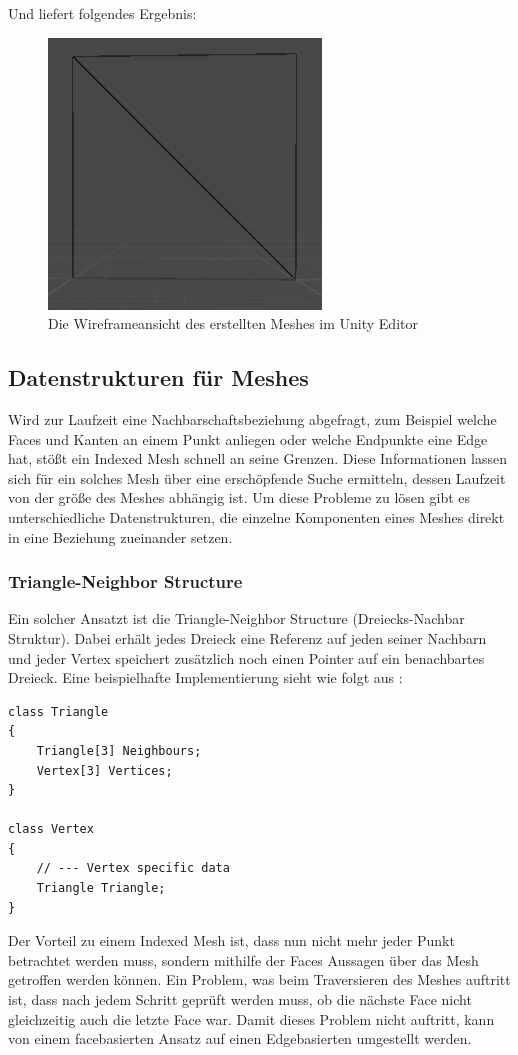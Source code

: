 Und liefert folgendes Ergebnis:
\begin{figure}[h]
	\centering
	\includegraphics[width=0.35\linewidth]{Images/UnityQuadWireframe}
	\caption[Die Wireframeansicht des erstellten Meshes]{Die Wireframeansicht des erstellten Meshes im Unity Editor}
	\label{fig:unityquadwireframe}
\end{figure}

\subsection{Datenstrukturen f\"ur Meshes}
Wird zur Laufzeit eine Nachbarschaftsbeziehung abgefragt, zum Beispiel welche Faces und Kanten an einem Punkt anliegen oder welche Endpunkte eine Edge hat, st\"o{\ss}t ein Indexed Mesh schnell an seine Grenzen. Diese Informationen lassen sich f\"ur ein solches Mesh \"uber eine ersch\"opfende Suche ermitteln, dessen Laufzeit von der gr\"o{\ss}e des Meshes abh\"angig ist. Um diese Probleme zu l\"osen gibt es unterschiedliche Datenstrukturen, die einzelne Komponenten eines Meshes direkt in eine Beziehung zueinander setzen.

\subsubsection{Triangle-Neighbor Structure}
Ein solcher Ansatzt ist die Triangle-Neighbor Structure (Dreiecks-Nachbar Struktur). Dabei erh\"alt jedes Dreieck eine Referenz auf jeden seiner Nachbarn und jeder Vertex speichert zus\"atzlich noch einen Pointer auf ein benachbartes Dreieck. Eine beispielhafte Implementierung sieht wie folgt aus \cite[S.269]{Shirley2010}:
\begin{lstlisting}
class Triangle 
{
	Triangle[3] Neighbours;
	Vertex[3] Vertices; 
}

class Vertex 
{
	// --- Vertex specific data
	Triangle Triangle;
}
\end{lstlisting}

Der Vorteil zu einem Indexed Mesh ist, dass nun nicht mehr jeder Punkt betrachtet werden muss, sondern mithilfe der Faces Aussagen \"uber das Mesh getroffen werden k\"onnen. Ein Problem, was beim Traversieren des Meshes auftritt ist, dass nach jedem Schritt gepr\"uft werden muss, ob die n\"achste Face nicht gleichzeitig auch die letzte Face war. Damit dieses Problem nicht auftritt, kann von einem facebasierten Ansatz auf einen Edgebasierten umgestellt werden.

